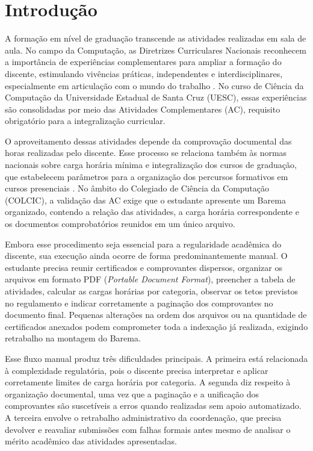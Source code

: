 \chapter{Introdução}
\label{cap:introducao}

A formação em nível de graduação transcende as atividades realizadas em sala de aula. No campo da Computação, as Diretrizes Curriculares Nacionais reconhecem a importância de experiências complementares para ampliar a formação do discente, estimulando vivências práticas, independentes e interdisciplinares, especialmente em articulação com o mundo do trabalho \cite{brasil2016resolucao}. No curso de Ciência da Computação da Universidade Estadual de Santa Cruz (UESC), essas experiências são consolidadas por meio das Atividades Complementares (AC), requisito obrigatório para a integralização curricular.

O aproveitamento dessas atividades depende da comprovação documental das horas realizadas pelo discente. Esse processo se relaciona também às normas nacionais sobre carga horária mínima e integralização dos cursos de graduação, que estabelecem parâmetros para a organização dos percursos formativos em cursos presenciais \cite{brasil2007resolucao}. No âmbito do Colegiado de Ciência da Computação (COLCIC), a validação das AC exige que o estudante apresente um Barema organizado, contendo a relação das atividades, a carga horária correspondente e os documentos comprobatórios reunidos em um único arquivo.

Embora esse procedimento seja essencial para a regularidade acadêmica do discente, sua execução ainda ocorre de forma predominantemente manual. O estudante precisa reunir certificados e comprovantes dispersos, organizar os arquivos em formato PDF (\textit{Portable Document Format}), preencher a tabela de atividades, calcular as cargas horárias por categoria, observar os tetos previstos no regulamento e indicar corretamente a paginação dos comprovantes no documento final. Pequenas alterações na ordem dos arquivos ou na quantidade de certificados anexados podem comprometer toda a indexação já realizada, exigindo retrabalho na montagem do Barema.

Esse fluxo manual produz três dificuldades principais. A primeira está relacionada à complexidade regulatória, pois o discente precisa interpretar e aplicar corretamente limites de carga horária por categoria. A segunda diz respeito à organização documental, uma vez que a paginação e a unificação dos comprovantes são suscetíveis a erros quando realizadas sem apoio automatizado. A terceira envolve o retrabalho administrativo da coordenação, que precisa devolver e reavaliar submissões com falhas formais antes mesmo de analisar o mérito acadêmico das atividades apresentadas.

